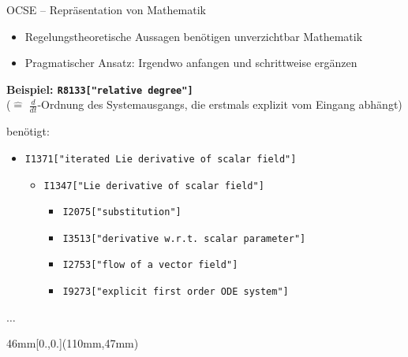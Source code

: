 \documentclass[
	ngerman,
	10pt,				%
	aspectratio=169 	%
]{beamer}
\newcommand\py\lstinline
\begin{document}
\begin{frame}[t,fragile,label=ocse3]{\large OCSE -- Repräsentation von Mathematik}

\begin{itemize}
 \item Regelungstheoretische Aussagen benötigen unverzichtbar Mathematik
%  
 \pause
 \medskip
 \item Pragmatischer Ansatz: Irgendwo anfangen und schrittweise ergänzen
\end{itemize}


 \pause
 \medskip

\textbf{Beispiel: \py{R8133["relative degree"]}} \\
($\hat{=}$ $\frac{d}{dt}$-Ordnung des Systemausgangs, die erstmals explizit vom Eingang abhängt)

\pause
\smallskip
benötigt:

\smallskip
\begin{itemize}
 \item \py|I1371["iterated Lie derivative of scalar field"]|
 \pause
    \begin{itemize}
    \item[\textbullet] \py|I1347["Lie derivative of scalar field"]|
    \pause
        \begin{itemize}
        \item[\textbullet] \py|I2075["substitution"]|
        \item[\textbullet] \py|I3513["derivative w.r.t. scalar parameter"]|
        \item[\textbullet] \py|I2753["flow of a vector field"]|
        \item[\textbullet] \py|I9273["explicit first order ODE system"]|
        \end{itemize}
    \end{itemize}
\end{itemize}

$\ldots$


\begin{textblock*}{46mm}[0.,0.](110mm,47mm)
\end{textblock*}


\end{frame}
  
\end{document}
